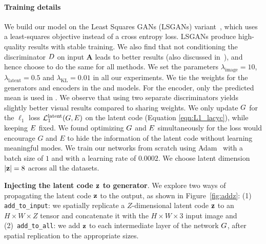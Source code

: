 \paragraph{Training details} We build our model on the Least Squares GANs (LSGANs) variant~\citep{mao2016least}, which uses a least-squares objective instead of a cross entropy loss. LSGANs produce high-quality results with stable training. We also find that not conditioning the discriminator $D$ on input $\mathbf{A}$ leads to better results (also discussed in~\citep{pathakCVPR16context}), and hence choose to do the same for all methods. We set the parameters $\lambda_{\text{image}}=10$, $\lambda_{\text{latent}}=0.5$ and $\lambda_{\text{KL}}=0.01$ in all our experiments. We tie the weights for the generators and encoders in the \cvaegan and \cinfogan models. For the encoder, only the predicted mean is used in \cinfogan. We observe that using two separate discriminators yields slightly better visual results compared to sharing weights. We only update $G$ for the $\ell_1$ loss $\mathcal{L}_{1}^{\text{latent}}(G,E)$ on the latent code (Equation \ref{eqn:L1_lacyc}), while keeping $E$ fixed. We found optimizing $G$ and $E$ simultaneously for the loss would encourage $G$ and $E$ to hide the information of the latent code without learning meaningful modes.
We train our networks from scratch using Adam~\citep{kingma2014adam} with a batch size of $1$ and with a learning rate of $0.0002$. We choose latent dimension $|\mathbf{z}|=8$ across all the datasets. 

{\bf Injecting the latent code $\mathbf{z}$ to generator}.
We explore two ways of propagating the latent code $\mathbf{z}$ to the output, as shown in Figure~\ref{fig:addz}: 
(1) \texttt{add\_to\_input}: we spatially replicate a $Z$-dimensional latent code $\mathbf{z}$ to an $H\!\times W\!\times Z$ tensor and concatenate it with the $H\!\times W\!\times 3$ input image and (2)~\texttt{add\_to\_all}: we add $\mathbf{z}$ to each intermediate layer of the network $G$, after spatial replication to the appropriate sizes.

\vspace{-1mm}